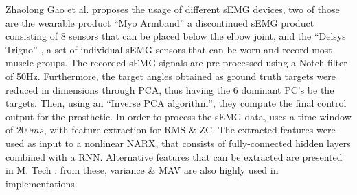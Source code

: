\documentclass[../main.tex]{subfiles}
\begin{document}
Zhaolong Gao et al. \cite{Zhaolong2021} proposes the usage of different sEMG devices, two of those are the wearable product ``Myo Armband'' \cite{myo} a discontinued sEMG product consisting of 8 sensors that can be placed below the elbow joint, and the ``Delsys Trigno'' \cite{trigno}, a set of individual sEMG sensors that can be worn and record most muscle groups.
The recorded sEMG signals are pre-processed using a Notch filter of 50Hz.
Furthermore, the target angles obtained as ground truth targets were reduced in dimensions through PCA, thus having the 6 dominant PC's be the targets.
Then, using an ``Inverse PCA algorithm'', they compute the final control output for the prosthetic.
In order to process the sEMG data, \cite{Zhaolong2021} uses a time window of $200ms$, with feature extraction for \gls{RMS} \& \gls{ZC}.
The extracted features were used as input to a nonlinear \gls{NARX}, that consists of
fully-connected hidden layers
combined with a \gls{RNN}. 
Alternative features that can be extracted are presented in M. Tech \cite{Tech2015}.
from these, variance \& \gls{MAV}
are also highly used in implementations.
\end{document}
